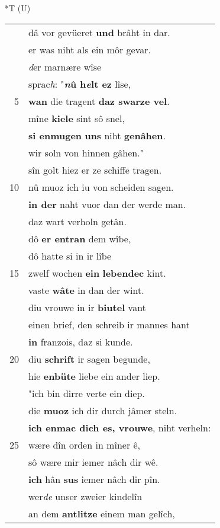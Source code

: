 \documentclass[8pt,a4paper,notitlepage]{article}
\begin{document}
\begin{table}[ht]
\begin{minipage}[t]{0.5\linewidth}
\small
\begin{center}*T (U)
\end{center}
\begin{tabular}{rl}
 & dâ vor gevüeret \textbf{und} brâht in dar.\\ 
 & er was niht als ein môr gevar.\\ 
 & \textit{d}er marnære wîse\\ 
 & sprac\textit{h}: "\textbf{\textit{n}û h\textit{e}lt ez} lîse,\\ 
5 & \textbf{wan} die tragent \textbf{daz swarze vel}.\\ 
 & mîne \textbf{kiele} sint sô snel,\\ 
 & \textbf{si enmugen} \textbf{uns} niht \textbf{genâhen}.\\ 
 & wir soln von hinnen gâhen."\\ 
 & sîn golt hiez er ze schiffe tragen.\\ 
10 & nû muoz ich iu von scheiden sagen.\\ 
 & \textbf{in der} naht vuor dan der werde man.\\ 
 & daz wart verholn getân.\\ 
 & dô \textbf{er entran} dem wîbe,\\ 
 & dô hatte si in ir lîbe\\ 
15 & zwelf wochen \textbf{ein} \textbf{lebendec} kint.\\ 
 & vaste \textbf{wâte} in dan der wint.\\ 
 & diu vrouwe in ir \textbf{biutel} vant\\ 
 & einen brief, den schreib ir mannes hant\\ 
 & \textbf{in} franzois, daz si kunde.\\ 
20 & diu \textbf{schrift} ir sagen begunde,\\ 
 & hie \textbf{enbüte} liebe ein ander liep.\\ 
 & "ich bin dirre verte ein diep.\\ 
 & die \textbf{muoz} ich dir durch jâmer steln.\\ 
 & \textbf{ich enmac dich es, vrouwe}, niht verheln:\\ 
25 & wære dîn orden in mîner ê,\\ 
 & sô wære mir iemer nâch dir wê.\\ 
 & \textbf{ich} hân \textbf{sus} iemer nâch dir pîn.\\ 
 & wer\textit{de} unser zweier kindelîn\\ 
 & an dem \textbf{antlitze} einem man gelîch,\\ 

\end{tabular}
\end{minipage}
\end{table}
\end{document}
